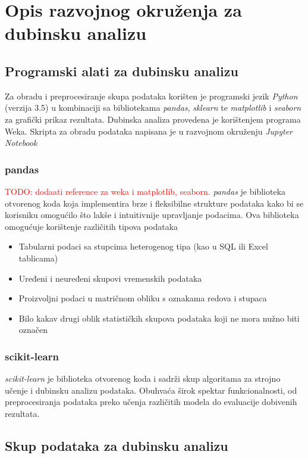 \section{Opis razvojnog okruženja za dubinsku analizu}
\label{ch:ch2}

\subsection{Programski alati za dubinsku analizu}
Za obradu i preprocesiranje skupa podataka korišten je programski jezik \textit{Python} (verzija 3.5)
u kombinaciji sa bibliotekama \textit{pandas}, \textit{sklearn} te \textit{matplotlib} i \textit{seaborn} za grafički prikaz rezultata. Dubinska analiza provedena je korištenjem programa Weka. Skripta za obradu podataka napisana 
je u razvojnom okruženju \textit{Jupyter Notebook}

\subsubsection*{pandas}
\textcolor{red}{TODO: dodaati reference za weka i matplotlib, seaborn.}
\textit{pandas} je biblioteka otvorenog koda koja implementira brze i fleksibilne strukture podataka kako bi se korisniku omogućilo što lakše i intuitivnije upravljanje podacima\cite{McKinney01}. Ova biblioteka omogućuje korištenje različitih tipova podataka
\begin{itemize}
   \item Tabularni podaci sa stupcima heterogenog tipa (kao u SQL ili Excel tablicama)
   \item Uređeni i neuređeni skupovi vremenskih podataka
   \item Proizvoljni podaci u matričnom obliku s oznakama redova i stupaca
   \item Bilo kakav drugi oblik statističkih skupova podataka koji ne mora nužno biti označen
\end{itemize}

\subsubsection*{scikit-learn}
\textit{scikit-learn} je biblioteka otvorenog koda i sadrži skup algoritama za strojno učenje i dubinsku analizu podataka\cite{Pedregosa01}. Obuhvaća širok spektar funkcionalnosti, od preprocesiranja podataka preko učenja različitih modela do evaluacije dobivenih rezultata.

\subsection{Skup podataka za dubinsku analizu}

